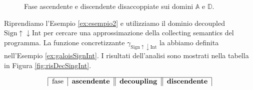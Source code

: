 \begin{figure}[H]
    \centering
    \caption{Fase ascendente e discendente disaccoppiate sui domini \(\mathbb{A}\) e \(\mathbb{D}\).}
    \label{fig:decFig}
\end{figure}

\begin{example}
Riprendiamo l'Esempio \ref{ex:esempio2} e utilizziamo il dominio decoupled \(\textrm{Sign}\uparrow\downarrow\textrm{Int}\) per cercare una approssimazione della collecting semantics del programma. La funzione concretizzante \(\gamma_{\textrm{Sign}\uparrow\downarrow\textrm{Int}}\) la abbiamo definita nell'Esempio \ref{ex:galoisSignInt}. I risultati dell'analisi sono mostrati nella tabella in Figura \ref{fig:risDecSingInt}. 

\begin{table}[H]
\begin{minipage}{\textwidth}
    \centering
    \vspace{1cm}
        \[
        \begin{tabular}{|c|c|c|c||c||c|c|c||}
        \hline
        \multicolumn{2}{|c|}{fase} & 
        \multicolumn{2}{c||}{\textbf{ascendente}} & 
        \multicolumn{1}{c||}{\textbf{decoupling}} & 
        \multicolumn{2}{c|}{\textbf{discendente}}\\
        

\end{tabular}\]
\end{minipage}
\end{table}
\end{example}
